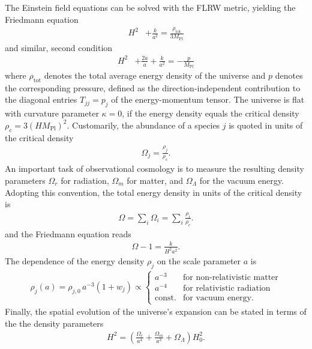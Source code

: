 The Einstein field equations can be solved with the FLRW metric, yielding the Friedmann equation
\begin{align}
    H^2& + \frac{k}{a^2} = \frac{\rho_{\text{tot}}}{3 M_{\text{Pl}}}
\end{align}
and similar, second condition
\begin{align}
    H^2& + \frac{2 \ddot{a}}{a} + \frac{k}{a^2} = - \frac{p}{M_{\text{Pl}}}
\end{align}
where \(\rho_{\text{tot}}\) denotes the total average energy density of the universe and \(p\) denotes the corresponding pressure, defined as the direction-independent contribution to the diagonal entries \(T_{jj} = p_{j}\) of the energy-momentum tensor. The universe is flat with curvature parameter \(\kappa = 0\), if the energy density equals the critical density \(\rho_{c} = 3 (H M_{\text{Pl}})^2\). Customarily, the abundance of a species \(j\) is quoted in units of the critical density
\begin{align}
    \Omega_{j} = \frac{\rho_{j}}{\rho_{c}}.
\end{align}
An important task of observational cosmology is to measure the resulting density parameters \(\Omega_{r}\) for radiation, \(\Omega_{m}\) for matter, and \(\Omega_{\Lambda}\) for the vacuum energy. Adopting this convention, the total energy density in units of the critical density is
\begin{align}
    \Omega = \sum_{i} \Omega_{i} = \sum_{i} \frac{\rho_{i}}{\rho_{c}}.
\end{align}
and the Friedmann equation reads
\begin{align}
    \Omega - 1 = \frac{k}{H^2 a^2}.
\end{align}
The dependence of the energy density \(\rho_{j}\) on the scale parameter \(a\) is
\begin{align}
    \rho_{j}(a) = \rho_{j, 0} \, a^{-3}(1+w_{j}) \propto \begin{cases}
                a^{-3} & \text{for non-relativistic matter} \\
                a^{-4} & \text{for relativistic radiation} \\
                \text{const.} & \text{for vacuum energy}.
                \end{cases}
\end{align}
Finally, the spatial evolution of the universe's expansion can be stated in terms of the the density parameters
\begin{align}
    H^2 = \left(\frac{\Omega_{r}}{a^4} + \frac{\Omega_{m}}{a^3} + \Omega_{\Lambda}\right) H_{0}^2.
\end{align}
